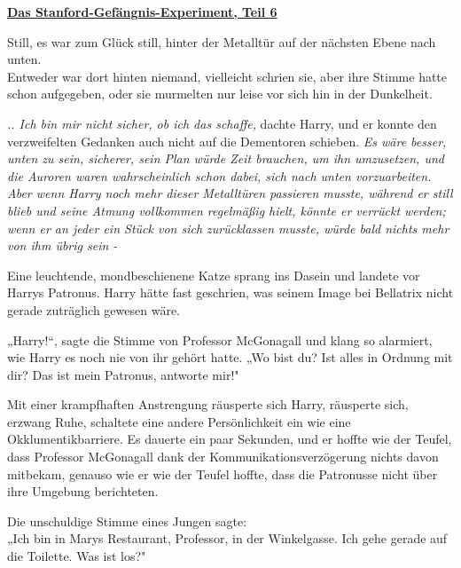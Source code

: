 

\hypertarget{das-stanford-gefuxe4ngnis-experiment-teil-6}{%

\textbf{\uline{Das Stanford-Gefängnis-Experiment, Teil 6}}

\hfill\break Still, es war zum Glück still, hinter der Metalltür auf der nächsten Ebene nach unten.\\ Entweder war dort hinten niemand, vielleicht schrien sie, aber ihre Stimme hatte schon aufgegeben, oder sie murmelten nur leise vor sich hin in der Dunkelheit.

\emph{.. Ich bin mir nicht sicher, ob ich das schaffe,} dachte Harry, und er konnte den verzweifelten Gedanken auch nicht auf die Dementoren schieben. \emph{Es wäre besser, unten zu sein, sicherer, sein Plan würde Zeit brauchen, um ihn umzusetzen, und die Auroren waren wahrscheinlich schon dabei, sich nach unten vorzuarbeiten. Aber wenn Harry noch mehr dieser Metalltüren passieren musste, während er still blieb und seine Atmung vollkommen regelmäßig hielt, könnte er verrückt werden; wenn er an jeder ein Stück von sich zurücklassen musste, würde bald nichts mehr von ihm übrig sein -}

Eine leuchtende, mondbeschienene Katze sprang ins Dasein und landete vor Harrys Patronus. Harry hätte fast geschrien, was seinem Image bei Bellatrix nicht gerade zuträglich gewesen wäre.

„Harry!“, sagte die Stimme von Professor McGonagall und klang so alarmiert, wie Harry es noch nie von ihr gehört hatte. „Wo bist du? Ist alles in Ordnung mit dir? Das ist mein Patronus, antworte mir!"

Mit einer krampfhaften Anstrengung räusperte sich Harry, räusperte sich, erzwang Ruhe, schaltete eine andere Persönlichkeit ein wie eine Okklumentikbarriere. Es dauerte ein paar Sekunden, und er hoffte wie der Teufel, dass Professor McGonagall dank der Kommunikationsverzögerung nichts davon mitbekam, genauso wie er wie der Teufel hoffte, dass die Patronusse nicht über ihre Umgebung berichteten.

Die unschuldige Stimme eines Jungen sagte:\\ „Ich bin in Marys Restaurant, Professor, in der Winkelgasse. Ich gehe gerade auf die Toilette. Was ist los?"

}
